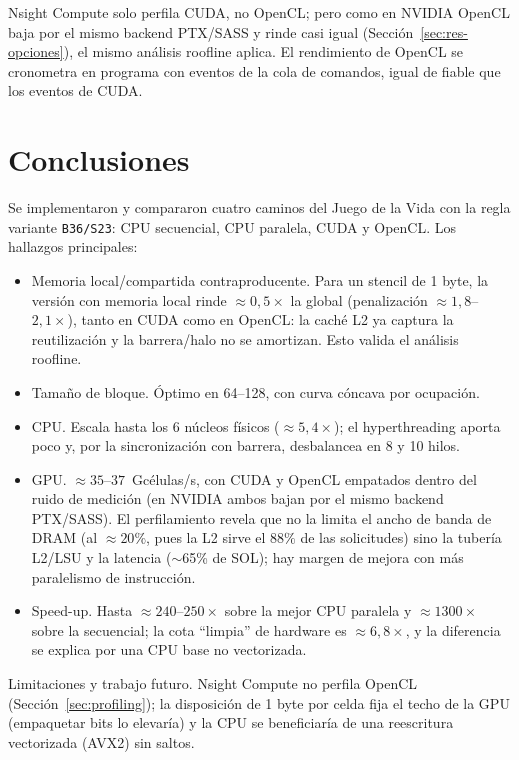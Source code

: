 \documentclass[
	spanish,
	letterpaper, oneside
]{article}
\begin{document}
Nsight Compute solo perfila CUDA, no OpenCL; pero como en NVIDIA OpenCL baja por el
mismo backend PTX/SASS y rinde casi igual (Sección~\ref{sec:res-opciones}), el mismo
análisis roofline aplica. El rendimiento de OpenCL se cronometra en programa
con eventos de la cola de comandos, igual de fiable que los eventos de CUDA.

\section{Conclusiones}
\label{sec:conclusiones}

Se implementaron y compararon cuatro caminos del Juego de la Vida con la regla
variante \texttt{B36/S23}: CPU secuencial, CPU paralela, CUDA y OpenCL. Los
hallazgos principales:

\begin{itemize}
	\item Memoria local/compartida contraproducente. Para un stencil
	      de 1 byte, la versión con memoria local rinde $\approx 0{,}5\times$ la global
	      (penalización $\approx 1{,}8$--$2{,}1\times$), tanto en CUDA como en
	      OpenCL: la caché L2 ya captura la reutilización y la barrera/halo no se
	      amortizan. Esto valida el análisis roofline.
	\item Tamaño de bloque. Óptimo en 64--128, con curva cóncava por
	      ocupación.
	\item CPU. Escala hasta los 6 núcleos físicos ($\approx 5{,}4\times$); el
	      hyperthreading aporta poco y, por la sincronización con barrera,
	      desbalancea en 8 y 10 hilos.
	\item GPU. $\approx 35$--$37$~Gcélulas/s, con CUDA y OpenCL
	      empatados dentro del ruido de medición (en NVIDIA ambos bajan por el mismo
	      backend PTX/SASS). El perfilamiento revela que no la limita el ancho de banda
	      de DRAM (al $\approx20\%$, pues la L2 sirve el $88\%$ de las solicitudes)
	      sino la tubería L2/LSU y la latencia ($\sim$65\% de SOL); hay margen de
	      mejora con más paralelismo de instrucción.
	\item Speed-up. Hasta $\approx 240$--$250\times$ sobre la mejor CPU
	      paralela y $\approx 1300\times$ sobre la secuencial; la cota ``limpia'' de
	      hardware es $\approx 6{,}8\times$, y la diferencia se explica por una CPU base
	      no vectorizada.
\end{itemize}

Limitaciones y trabajo futuro. Nsight Compute no perfila OpenCL
(Sección~\ref{sec:profiling}); la disposición de 1 byte por celda fija el techo de la
GPU (empaquetar bits lo elevaría) y la CPU se beneficiaría de una reescritura
vectorizada (AVX2) sin saltos.

\end{document}
